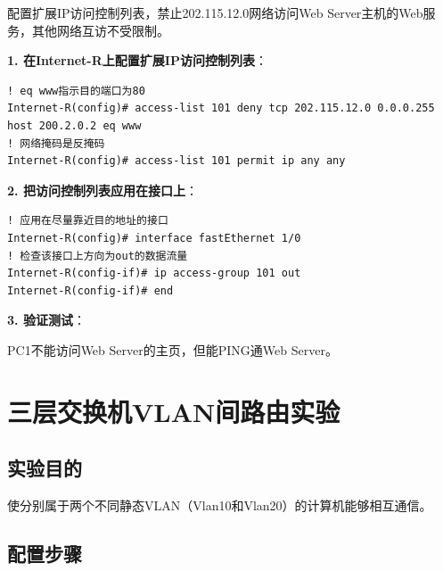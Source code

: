 \documentclass[12pt,a4paper]{ctexart}
\begin{document}
\begin{exambox}[实验要求]
配置扩展IP访问控制列表，禁止202.115.12.0网络访问Web Server主机的Web服务，其他网络互访不受限制。
\end{exambox}

\begin{cmdbox}
\textbf{1. 在Internet-R上配置扩展IP访问控制列表}：
\begin{lstlisting}
! eq www指示目的端口为80
Internet-R(config)# access-list 101 deny tcp 202.115.12.0 0.0.0.255 host 200.2.0.2 eq www
! 网络掩码是反掩码
Internet-R(config)# access-list 101 permit ip any any
\end{lstlisting}

\textbf{2. 把访问控制列表应用在接口上}：
\begin{lstlisting}
! 应用在尽量靠近目的地址的接口
Internet-R(config)# interface fastEthernet 1/0
! 检查该接口上方向为out的数据流量
Internet-R(config-if)# ip access-group 101 out
Internet-R(config-if)# end
\end{lstlisting}

\textbf{3. 验证测试}：

PC1不能访问Web Server的主页，但能PING通Web Server。
\end{cmdbox}

\section{三层交换机VLAN间路由实验}

\subsection{实验目的}

使分别属于两个不同静态VLAN（Vlan10和Vlan20）的计算机能够相互通信。

\subsection{配置步骤}
\end{document}
